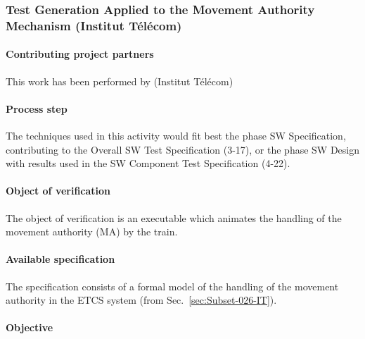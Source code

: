 

\subsubsection{Test Generation Applied to the Movement Authority Mechanism (Institut T\'el\'ecom)  }
\label{sec:TestGen-IT}

\paragraph{Contributing project partners}

This work has been performed by (Institut T\'el\'ecom)

\paragraph{Process step}

The techniques used in this activity would fit best the phase SW Specification, contributing
to the Overall SW Test Specification (3-17), or the phase SW Design
with results used in the SW Component Test Specification (4-22). 

\paragraph{Object of verification}

The object of verification is an executable which animates the
handling of the movement authority (MA) by the train.

\paragraph{Available specification}
The specification consists of a formal model of the handling of the
movement authority in the ETCS system (from Sec.~\ref{sec:Subset-026-IT}).

\paragraph{Objective}

